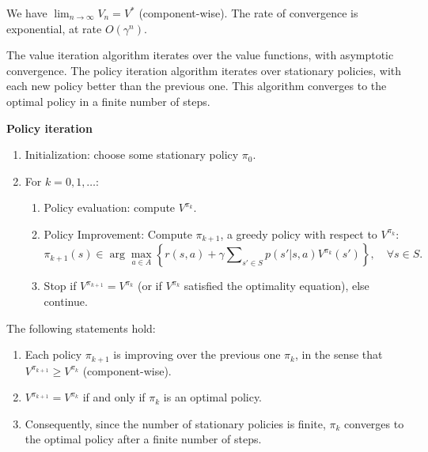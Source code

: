 \begin{theorem}\label{thm:_VI}
We have ${\lim _{n \to \infty }}{V_n} = V_{}^*$ (component-wise). The rate of convergence is exponential, at rate  $O({\gamma ^n})$.
\end{theorem}

The value iteration algorithm iterates over the value functions, with asymptotic convergence. The policy iteration algorithm iterates over stationary policies, with each new policy better than the previous one. This algorithm converges to the optimal policy in a finite number of steps.

\begin{algorithm_}\textbf{Policy iteration}\label{alg:PI}
\begin{enumerate}
\item Initialization: choose some stationary policy ${\pi _0}$.
\item For $k = 0,1, \ldots $:
\begin{enumerate}
\item Policy evaluation: compute ${V^{{\pi _k}}}$.
\item Policy Improvement: Compute ${\pi _{k + 1}}$, a greedy policy with respect to ${V^{{\pi _k}}}$:
\[{\pi _{k + 1}}(s) \in \arg {\max _{a \in A}}\left\{ {r(s,a) + \gamma \sum\nolimits_{s' \in S} {p(s'|s,a){V^{{\pi _k}}}(s')} } \right\},\quad \forall s \in S.\]
\item Stop if  ${V^{{\pi _{k + 1}}}} = {V^{{\pi _k}}}$ (or if ${V^{{\pi _k}}}$ satisfied the optimality equation), else continue.
\end{enumerate}
\end{enumerate}
\end{algorithm_}

\begin{theorem}\label{thm:_PI}
The following statements hold:
\begin{enumerate}
  \item Each policy ${\pi _{k + 1}}$ is improving over the previous one ${\pi _k}$, in the sense that ${V^{{\pi _{k + 1}}}} \ge {V^{{\pi _k}}}$ (component-wise).
  \item ${V^{{\pi _{k + 1}}}} = {V^{{\pi _k}}}$ if and only if ${\pi _k}$ is an optimal policy.
  \item Consequently, since the number of stationary policies is finite, ${\pi _k}$ converges to the optimal policy after a finite number of steps.
\end{enumerate}
\end{theorem}

